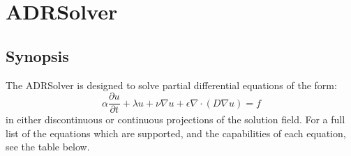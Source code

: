 \chapter{ADRSolver}


\section{Synopsis}

The ADRSolver is designed to solve partial differential equations of the form:
\begin{equation}
\alpha \dfrac{\partial u}{\partial t} + \lambda u + \nu \nabla u + \epsilon \nabla \cdot (D \nabla u) = f
\end{equation}
in either discontinuous or continuous projections of the solution field. 
For a full list of the equations which are supported, and the capabilities of each equation, 
see the table below.

